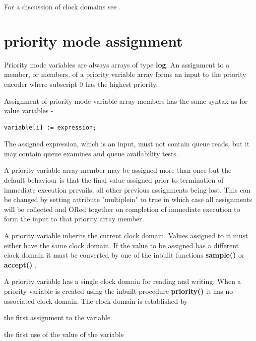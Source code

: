         For a discussion of clock domains see .
        



    \section{priority mode assignment}\label{sec:priass}
    
        Priority mode variables are always arrays of type {\bf log}. An
        assignment to a member, or members, of a priority variable array forms
        an input to the priority encoder where subscript 0 has the highest
        priority.
        
        Assignment of priority mode variable array members has the same syntax
        as for value variables -
        \begin{lstlisting}[gobble=8, language=threepl]
               variable[i] := expression;
        \end{lstlisting}
        
        The assigned expression, which is an input, must not contain queue
        reads, but it may contain queue examines and queue availability tests.
        
        A priority variable array member may be assigned more than once but the
        default behaviour is that the final value assigned prior to termination
        of immediate execution prevails, all other previous assignments being
        lost. This can be changed by setting attribute "multiplein" to true in
        which case all assignments will be collected and ORed together on
        completion of immediate execution to form the input to that priority
        array member.
            
        A priority variable inherits the current clock domain. Values assigned
        to it must either have the same clock domain. If the value to be
        assigned has a different clock domain it must be converted by one of
        the inbuilt functions {\bf sample()}  or {\bf
        accept()} .

        A priority variable has a single clock domain for reading and writing.
        When a priority variable is created using the inbuilt procedure {\bf
        priority()}  it has no associated clock domain.
        The clock domain is established by
        \blist
        \item   the first assignment to the variable
        \item   the first use of the value of the variable
        \blend
        
